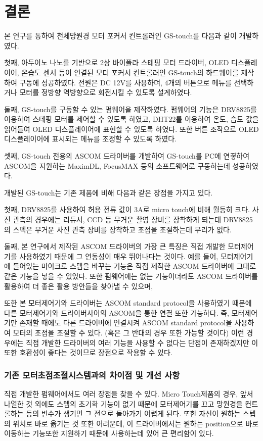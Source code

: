 \section{결론}
	
본 연구를 통하여 천체망원경 모터 포커서 컨트롤러인 GS-touch를 다음과 같이 개발하였다. 

첫째, 아두이노 나노를 기반으로 2상 바이폴라 스테핑 모터 드라이버, OLED 디스플레이어, 온습도 센서 등이 연결된 모터 포커서 컨트롤러인 GS-touch의 하드웨어를 제작하여 구동에 성공하였다. 전원은 DC 12V를 사용하며, 4개의 버튼으로 메뉴를 선택하거나 모터를 정방향 역방향으로 회전시킬 수 있도록 설계하였다.

둘째, GS-touch를 구동할 수 있는 펌웨어을 제작하였다. 펌웨어의 기능은 DRV8825를 이용하여 스테핑 모터를 제어할 수 있도록 하였고, DHT22를 이용하여 온도, 습도 값을 읽어들여 OLED 디스플레이어에 표현할 수 있도록 하였다. 또한 버튼 조작으로 OLED 디스플레이어에 표시되는 메뉴를 조정할 수 있도록 하였다. 

셋째, GS-touch 전용의 ASCOM 드라이버를 개발하여 GS-touch를 PC에 연곃하여 ASCOM을 지원하는 MaximDL, FocusMAX 등의 소프트웨어로 구동하는데 성공하였다.

개발된 GS-touch는 기존 제품에 비해 다음과 같은 장점을 가지고 있다. 

첫째, DRV8825를 사용하여 허용 전류 값이 $3 \textrm{A}$로 micro touch에 비해 월등히 크다. 사진 관측의 경우에는 리듀서, CCD 등 무거운 촬영 장비를 장착하게 되는데 DRV8825의 스펙은 무거운 사진 관측 장비를 장착하고 초점을 조절하는데 무리가 없다.

둘째, 본 연구에서 제작된 ASCOM 드라이버의 가장 큰 특징은 직접 개발한 모터제어기를 사용하였기 때문에 그 연동성이 매우 뛰어나다는 것이다. 예를 들어, 모터제어기에 들어있는 마이크로 스텝을 바꾸는 기능은 직접 제작한 ASCOM 드라이버에 그대로 같은 기능을 넣을 수 있었다. 또한 펌웨어에는 없는 기능이더라도 ASCOM 드라이버를 활용하여 더 좋은 활용 방안들을 찾아낼 수 있으며, 

또한 본 모터제어기와 드라이버는 ASCOM standard protocol을 사용하였기 때문에 다른 모터제어기와 드라이버사이의 ASCOM을 통한 연결 또한 가능하다. 즉, 모터제어기만 존재할 때에도 다른 드라이버에 연결시켜 ASCOM standard protocol을 사용하여 모터의 초점을 조절할 수 있다. (혹은 그 반대의 경우 또한 가능할 것이다) 이런 경우에는 직접 개발한 드라이버의 여러 기능을 사용할 수 없다는 단점이 존재하겠지만 이 또한 호환성이 좋다는 것이므로 장점으로 작용할 수 있다.

\subsubsection{기존 모터초점조절시스템과의 차이점 및 개선 사항}
직접 개발한 펌웨어에서도 여러 장점을 찾을 수 있다. Micro Touch제품의 경우, 앞서 나열한 것 외에도 스텝의 초기화 기능이 없기 때문에 모터제어기를 끄고 망원경을 컨트롤하는 등의 변수가 생기면 그 전으로 돌아가기 어렵게 된다. 또한 자신이 원하는 스텝의 위치로 바로 옮기는 것 또한 어려운데, 이 드라이버에서는 원하는 position으로 바로 이동하는 기능또한 지원하기 때문에 사용하는데 있어 큰 편리함이 있다. 

